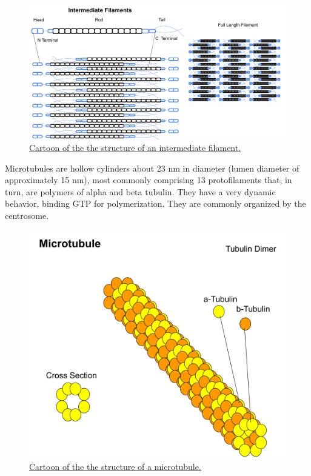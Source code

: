 \begin{figure}

{\centering \includegraphics[width=0.7\linewidth]{./figures/cells/Intermediate_filaments} 

}

\caption{\href{https://commons.wikimedia.org/wiki/File:Intermediate_filaments.svg}{Cartoon of the the structure of an intermediate filament.}}\label{fig:intermedfilament}
\end{figure}

Microtubules are hollow cylinders about 23 nm in diameter (lumen diameter of approximately 15 nm), most commonly comprising 13 protofilaments that, in turn, are polymers of alpha and beta tubulin. They have a very dynamic behavior, binding GTP for polymerization. They are commonly organized by the centrosome.



\begin{figure}

{\centering \includegraphics[width=0.7\linewidth]{./figures/cells/Microtubule_Structure} 

}

\caption{\href{https://commons.wikimedia.org/wiki/File:Microtubule_Structure.svg}{Cartoon of the the structure of a microtubule.}}\label{fig:microtubulestruc}
\end{figure}

